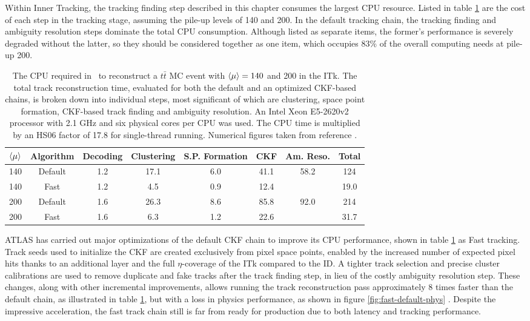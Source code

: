 Within Inner Tracking, the tracking finding step described in this chapter consumes the largest CPU resource. 
Listed in table \ref{tab:tracking-time-breakdown} are the cost of each step in the tracking stage, assuming the pile-up levels of 140 and 200. 
In the default tracking chain, the tracking finding and ambiguity resolution steps dominate the total CPU consumption. 
Although listed as separate items, the former's performance is severely degraded without the latter, so they should be considered together as one item, which occupies $83\%$ of the overall computing needs at pile-up 200.

\begin{table}[h!]
    \centering
    \begin{tabular}{|c|c||c|c|c|c|c||c|}
    \hline
       $\expval{\mu}$  & Algorithm & Decoding & Clustering & S.P. Formation & CKF & Am. Reso. &  Total \\
       \hline \hline
        140 & Default & 1.2 & 17.1 & 6.0 & 41.1 & 58.2 & 124 \\ \hline
        140 & Fast & 1.2 & 4.5 & 0.9 & 12.4 &  & 19.0 \\ \hline \hline

        200 & Default & 1.6 & 26.3 & 8.6 & 85.8 & 92.0 & 214 \\ \hline
        200 & Fast & 1.6 & 6.3 & 1.2 & 22.6 & & 31.7 \\ \hline
    \end{tabular}
    \caption{The CPU required in \hssec~to reconstruct a $t\bar{t}$ MC event with $\expval{\mu}=140$ and 200 in the ITk. The total track reconstruction time, evaluated for both the default and an optimized CKF-based chains, is broken down into individual steps, most significant of which are clustering, space point formation, CKF-based track finding and ambiguity resolution. An Intel Xeon E5-2620v2 processor with 2.1 GHz and six physical cores per CPU was used. The CPU time is multiplied by an HS06 factor of 17.8 for single-thread running. Numerical figures taken from reference \cite{ATL-PHYS-PUB-2019-041}.}
    \label{tab:tracking-time-breakdown}
\end{table}

ATLAS has carried out major optimizations of the default CKF chain to improve its CPU performance, shown in table \ref{tab:tracking-time-breakdown} as Fast tracking. 
Track seeds used to initialize the CKF are created exclusively from pixel space points, enabled by the increased number of expected pixel hits thanks to an additional layer and the full $\eta$-coverage of the ITk compared to the ID. 
A tighter track selection and precise cluster calibrations are used to remove duplicate and fake tracks after the track finding step, in lieu of the costly ambiguity resolution step. 
These changes, along with other incremental improvements, allows running the track reconstruction pass approximately 8 times faster than the default chain, as illustrated in table \ref{tab:tracking-time-breakdown}, but with a loss in physics performance, as shown in figure \ref{fig:fast-default-phys} \cite{ATL-PHYS-PUB-2019-041}.
Despite the impressive acceleration, the fast track chain still is far from ready for production due to both latency and tracking performance.

